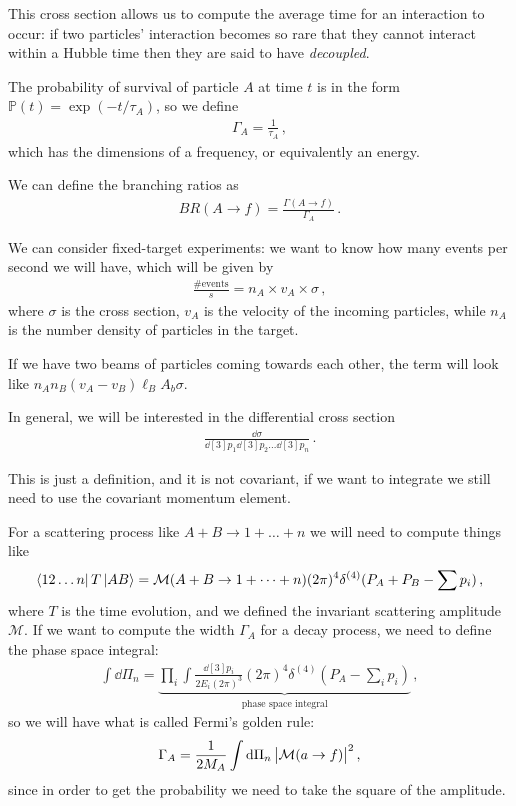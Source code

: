 \documentclass[main.tex]{subfiles}
\begin{document}
This cross section allows us to compute the average time for an interaction to occur: if two particles' interaction becomes so rare that they cannot interact within a Hubble time then they are said to have \emph{decoupled}. 

The probability of survival of particle \(A\) at time \(t\) is in the form \(\mathbb{P}(t) = \exp(-t / \tau_{A})\), so we define 
%
\begin{align}
\Gamma_{A} = \frac{1}{\tau_{A}}
\,,
\end{align}
%
which has the dimensions of a frequency, or equivalently an energy. 

We can define the branching ratios as 
%
\begin{align}
BR(A \to f) = \frac{ \Gamma (A \to f)}{\Gamma_{A}}
\,.
\end{align}

We can consider fixed-target experiments: we want to know how many events per second we will have, which will be given by 
%
\begin{align}
\frac{\text{\# events}}{s} = n_A \times v_A \times \sigma 
\,,
\end{align}
%
where \(\sigma \) is the cross section, \(v_A\) is the velocity of the incoming particles, while \(n_A\) is the number density of particles in the target. 

If we have two beams of particles coming towards each other, the term will look like \(n_A n_B (v_A - v_B) \ell_B A_b \sigma \). 

In general, we will be interested in the differential cross section 
%
\begin{align}
\frac{ \dd{\sigma }}{ \dd[3]{p_1 } \dd[3]{p_2 } \dots \dd[3]{p_{n}}}
\,.
\end{align}

This is just a definition, and it is not covariant, if we want to integrate we still need to use the covariant momentum element. 

For a scattering process like \(A+B \rightarrow 1 + \dots + n\)
we will need to compute things like 
%
\begin{align}
\bra{12 \dots n} T \ket{AB} = \mathcal{M} (A+B \rightarrow 1 + \dots + n) (2\pi )^{4} \delta^{(4)} (P_A + P_B - \sum p_i)
\,,
\end{align}
%
where \(T\) is the time evolution, and we defined the invariant scattering amplitude \(\mathcal{M}\). 
If we want to compute the width \(\Gamma_{A}\) for a decay process, we need to define the phase space integral:
%
\begin{align}
\int \dd{\Pi_{n}} = \underbrace{\prod_{i} \int \frac{ \dd[3]{p_i}}{2 E_i (2 \pi )^3} 
(2\pi )^{4} \delta^{(4)} (P_A - \sum _{i} p_i)}_{\text{phase space integral}}
\,,
\end{align}
%
so we will have what is called Fermi's golden rule:
%
\begin{align}
\Gamma_{A} = \frac{1}{2 M_A} \int \dd{\Pi_{n}} \abs{\mathcal{M} (a \rightarrow f)}^2
\,,
\end{align}
%
since in order to get the probability we need to take the square of the amplitude. 
\end{document}
